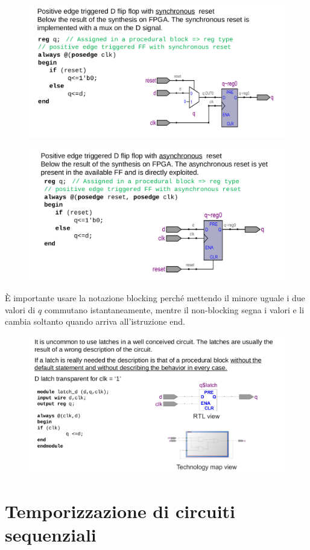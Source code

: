 \documentclass{book}
\begin{document}
        \begin{figure}[h!]
            \centering
            \includegraphics[width=0.75\linewidth]{img/chapt11img3.png}
        \end{figure}
        \begin{figure}[h!]
            \centering
            \includegraphics[width=0.75\linewidth]{img/chapt11img4.png}
        \end{figure} \newpage
        È importante usare la notazione blocking perché mettendo il minore uguale i due valori di $q$ commutano istantaneamente, mentre il non-blocking segna i valori e li cambia soltanto quando arriva all'istruzione end.
        \begin{figure}[h!]
            \centering
            \includegraphics[width=0.75\linewidth]{img/Chapt11img5.png}
        \end{figure}
\chapter{Temporizzazione di circuiti sequenziali}
\end{document}
